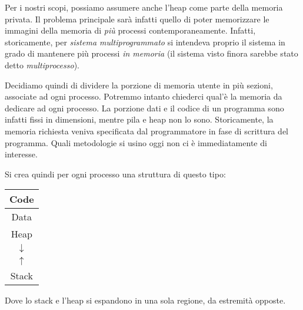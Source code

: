 \documentclass[a4paper,11pt]{article}
\begin{document}
Per i nostri scopi, possiamo assumere anche l'heap come parte della memoria privata. Il problema principale sarà infatti quello di poter memorizzare le immagini della memoria di \textit{più} processi contemporaneamente.
Infatti, storicamente, per \textit{sistema multiprogrammato} si intendeva proprio il sistema in grado di mantenere più processi \textit{in memoria} (il sistema visto finora sarebbe stato detto \textit{multiprocesso}).

Decidiamo quindi di dividere la porzione di memoria utente in più sezioni, associate ad ogni processo.
Potremmo intanto chiederci qual'è la memoria da dedicare ad ogni processo.
La porzione dati e il codice di un programma sono infatti fissi in dimensioni, mentre pila e heap non lo sono.
Storicamente, la memoria richiesta veniva specificata dal programmatore in fase di scrittura del programma.
Quali metodologie si usino oggi non ci è immediatamente di interesse.

Si crea quindi per ogni processo una struttura di questo tipo:
\begin{table}[H]
	\center 
	\begin{tabular} { | c | }
		\sffamily Code \\ 
		\hline
		\sffamily Data \\
		\hline
		\sffamily Heap \\ 
		$\downarrow$ \\
		$\uparrow$ \\
		\sffamily Stack
	\end{tabular}
\end{table}
Dove lo stack e l'heap si espandono in una sola regione, da estremità opposte.
\end{document}
